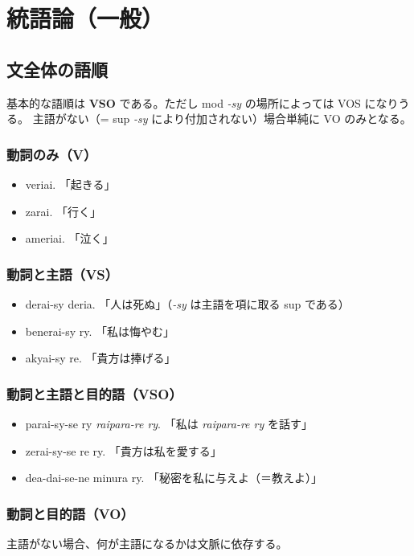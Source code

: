 \chapter{統語論（一般）}

\section{文全体の語順}

基本的な語順は \textbf{VSO} である。ただし mod \emph{-sy} の場所によっては VOS になりうる。
主語がない（= sup \emph{-sy} により付加されない）場合単純に VO のみとなる。

\subsection{動詞のみ（V）}

\begin{itemize}
    \item veriai.   「起きる」
    \item zarai.    「行く」
    \item ameriai.  「泣く」
\end{itemize}

\subsection{動詞と主語（VS）}
\begin{itemize}
    \item derai-sy deria.   「人は死ぬ」（\emph{-sy} は主語を項に取る sup である）
    \item benerai-sy ry.    「私は悔やむ」
    \item akyai-sy re.      「貴方は捧げる」
\end{itemize}

\subsection{動詞と主語と目的語（VSO）}

\begin{itemize}
    \item parai-sy-se ry \emph{raipara-re ry}. 「私は \emph{raipara-re ry} を話す」
    \item zerai-sy-se re ry. 「貴方は私を愛する」
    \item dea-dai-se-ne minura ry. 「秘密を私に与えよ（＝教えよ）」
\end{itemize}

\subsection{動詞と目的語（VO）}
主語がない場合、何が主語になるかは文脈に依存する。

